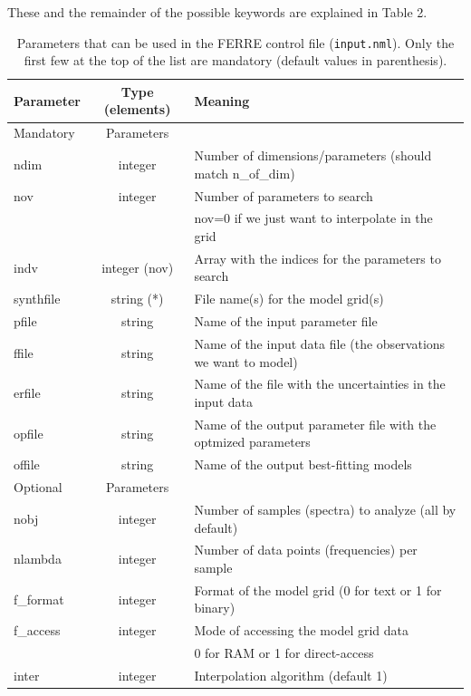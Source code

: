 \documentclass[12pt]{article}
\begin{document}
These and the remainder of the 
possible keywords are explained in Table 2.

\begin{table}
\label{t2}
\caption{Parameters that can be used in the FERRE control file ({\tt input.nml}). 
Only the first few at the top of the list are mandatory (default values in parenthesis).}
\begin{tabular}{lcl}
\hline
Parameter  & Type (elements) & Meaning \\
\hline
\hline
Mandatory  & Parameters \\
\hline
ndim     & integer            & Number of dimensions/parameters (should match 
n\_of\_dim) \\
nov      & integer            & Number of parameters to search \\
         &                    & nov=0 if we just want to interpolate in the grid \\
indv     & integer (nov)         & Array with the indices for the parameters to search \\
synthfile & string (*)           & File name(s) for the model grid(s) \\
pfile     &   string             & Name of the input parameter file \\
ffile     &   string             & Name of the input data file (the observations we want to model) \\
erfile    &   string             & Name of the file with the uncertainties 
	in the input data\\
opfile    &   string             & Name of the output parameter file with the optmized parameters \\
offile    &   string             & Name of the output best-fitting models \\ 
\hline
Optional   & Parameters \\
\hline 
nobj      &    integer           & Number of samples (spectra) to analyze (all by default) \\
nlambda   &    integer           & Number of data points (frequencies) per sample \\
f\_format  &    integer           & Format of the model grid (0 for text or 1 for binary)  \\
f\_access  &    integer           & Mode of accessing the model grid data \\
          &                       & 0 for RAM or  1 for direct-access \\
inter     &     integer           &  Interpolation algorithm (default 1) \\

\end{tabular}
\end{table}
\end{document}

